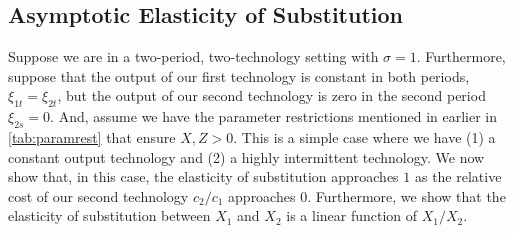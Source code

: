 \documentclass[11pt,a4paper,leqno]{extarticle}
\providecommand{\DIFadd}[1]{{\protect\color{blue}\uwave{#1}}} %
\providecommand{\DIFdel}[1]{{\protect\color{red}\sout{#1}}}                      %
\providecommand{\DIFaddbegin}{} %
\providecommand{\DIFaddend}{} %
\providecommand{\DIFdelbegin}{} %
\providecommand{\DIFdelend}{} %
\begin{document}
\subsection{Asymptotic Elasticity of Substitution}

\label{sec:asympeos}

Suppose we are in a two-period, two-technology setting with $\sigma = 1$. Furthermore, suppose that the output of our first technology is constant in both periods, $\xi_{1t} = \xi_{2t}$, but the output of our second technology is zero in the second period $\xi_{2s} = 0$. And, assume we have the parameter restrictions mentioned in earlier in \autoref{tab:paramrest} that ensure \DIFdelbegin \DIFdel{$X, Z > 0$}\DIFdelend \DIFaddbegin \DIFadd{$\mathbf{X}, \mathbf{Z} > 0$}\DIFaddend . This is a simple case where we have (1) a constant output technology and (2) a highly intermittent technology. We now show that, in this case, the elasticity of substitution approaches $1$ as the relative cost of our second technology $c_2/c_1$ approaches $0$. Furthermore, we show that the elasticity of substitution between $X_1$ and $X_2$ is a linear function of $X_1/X_2$.  
\end{document}
